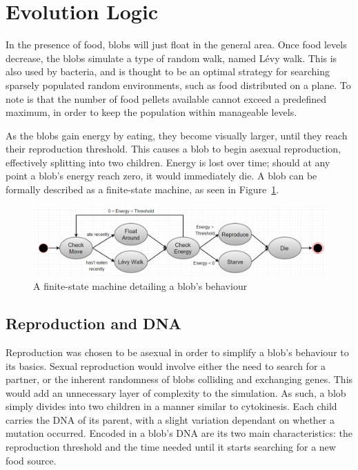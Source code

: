 \section{Evolution Logic}

In the presence of food, blobs will just float in the general area. Once food levels decrease, the blobs simulate a type of random walk, named L\'evy walk. This is also used by bacteria, and is thought to be an optimal strategy for searching sparsely populated random environments\cite{viswanathan1999optimizing}, such as food distributed on a plane. To note is that the number of food pellets available cannot exceed a predefined maximum, in order to keep the population within manageable levels.

As the blobs gain energy by eating, they become visually larger, until they reach their reproduction threshold. This causes a blob to begin asexual reproduction, effectively splitting into two children. Energy is lost over time; should at any point a blob's energy reach zero, it would immediately die. A blob can be formally described as a finite-state machine, as seen in Figure~\ref{fig:fsm}.

\begin{figure}[!th]
	\centering
	\includegraphics[scale=0.65]{images/fsm}
	\caption{\label{fig:fsm}A finite-state machine detailing a blob's behaviour}
\end{figure}

\subsection{Reproduction and DNA}
Reproduction was chosen to be asexual in order to simplify a blob's behaviour to its basics. Sexual reproduction would involve either the need to search for a partner, or the inherent randomness of blobs colliding and exchanging genes. This would add an unnecessary layer of complexity to the simulation. As such, a blob simply divides into two children in a manner similar to cytokinesis\cite{rappaport2005cytokinesis}.
Each child carries the DNA of its parent, with a slight variation dependant on whether a mutation occurred. Encoded in a blob's DNA are its two main characteristics: the reproduction threshold and the time needed until it starts searching for a new food source.